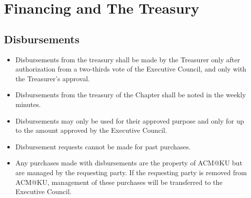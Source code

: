 %
%
\let\textcircled=\pgftextcircled
\chapter{Financing and The Treasury}
\label{chap:finance}

\initial{}

\section{Disbursements}
\begin{itemize}
   \item Disbursements from the treasury shall be made by the Treasurer only after authorization from a two-thirds vote of the Executive Council, and only with the Treasurer's approval.
   \item Disbursements from the treasury of the Chapter shall be noted in the weekly minutes.
   \item Disbursements may only be used for their approved purpose and only for up to the amount approved by the Executive Council.
   \item Disbursement requests cannot be made for past purchases.
   \item Any purchases made with disbursements are the property of ACM@KU but are managed by the requesting party. If the requesting party is removed from ACM@KU, management of these purchases will be transferred to the Executive Council.
\end{itemize}


